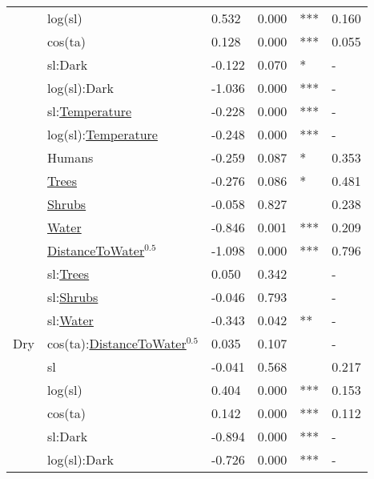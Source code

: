 \begin{tabular}[t]{llllll}
 & log(sl) & 0.532 & 0.000 & *** & 0.160\\

 & cos(ta) & 0.128 & 0.000 & *** & 0.055\\

 & sl:Dark & -0.122 & 0.070 & * & -\\

 & log(sl):Dark & -1.036 & 0.000 & *** & -\\

 & sl:\underline{Temperature} & -0.228 & 0.000 & *** & -\\

 & log(sl):\underline{Temperature} & -0.248 & 0.000 & *** & -\\

 & Humans & -0.259 & 0.087 & * & 0.353\\

 & \underline{Trees} & -0.276 & 0.086 & * & 0.481\\

 & \underline{Shrubs} & -0.058 & 0.827 &  & 0.238\\

 & \underline{Water} & -0.846 & 0.001 & *** & 0.209\\

 & \underline{DistanceToWater}$^{0.5}$ & -1.098 & 0.000 & *** & 0.796\\

 & sl:\underline{Trees} & 0.050 & 0.342 &  & -\\

 & sl:\underline{Shrubs} & -0.046 & 0.793 &  & -\\

 & sl:\underline{Water} & -0.343 & 0.042 & ** & -\\

\multirow{-16}{*}{\raggedright\arraybackslash Dry} & cos(ta):\underline{DistanceToWater}$^{0.5}$ & 0.035 & 0.107 &  & -\\
\cmidrule{1-6}
 & sl & -0.041 & 0.568 &  & 0.217\\

 & log(sl) & 0.404 & 0.000 & *** & 0.153\\

 & cos(ta) & 0.142 & 0.000 & *** & 0.112\\

 & sl:Dark & -0.894 & 0.000 & *** & -\\

 & log(sl):Dark & -0.726 & 0.000 & *** & -\\


\end{tabular}
